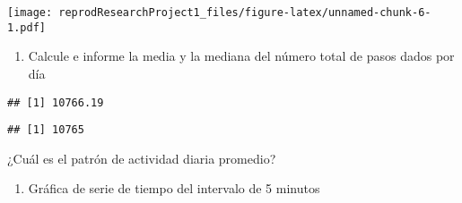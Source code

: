 \documentclass[
]{article}
\newenvironment{Shaded}{\begin{snugshade}}{\end{snugshade}}
\newcommand{\AttributeTok}[1]{\textcolor[rgb]{0.77,0.63,0.00}{#1}}
\newcommand{\FunctionTok}[1]{\textcolor[rgb]{0.00,0.00,0.00}{#1}}
\newcommand{\NormalTok}[1]{#1}
\newcommand{\OtherTok}[1]{\textcolor[rgb]{0.56,0.35,0.01}{#1}}
\newcommand{\SpecialCharTok}[1]{\textcolor[rgb]{0.00,0.00,0.00}{#1}}
\newcommand{\StringTok}[1]{\textcolor[rgb]{0.31,0.60,0.02}{#1}}
\providecommand{\tightlist}{%
  \setlength{\itemsep}{0pt}\setlength{\parskip}{0pt}}
\begin{document}
\begin{Shaded}
\end{Shaded}

\texttt{[image: reprodResearchProject1\_files/figure-latex/unnamed-chunk-6-1.pdf]}

\begin{enumerate}
\def\labelenumi{\arabic{enumi}.}
\setcounter{enumi}{2}
\tightlist
\item
  Calcule e informe la media y la mediana del número total de pasos
  dados por día
\end{enumerate}

\begin{Shaded}
\end{Shaded}

\begin{verbatim}
## [1] 10766.19
\end{verbatim}

\begin{Shaded}
\end{Shaded}

\begin{verbatim}
## [1] 10765
\end{verbatim}

¿Cuál es el patrón de actividad diaria promedio?

\begin{enumerate}
\def\labelenumi{\arabic{enumi}.}
\tightlist
\item
  Gráfica de serie de tiempo del intervalo de 5 minutos
\end{enumerate}
\end{document}
